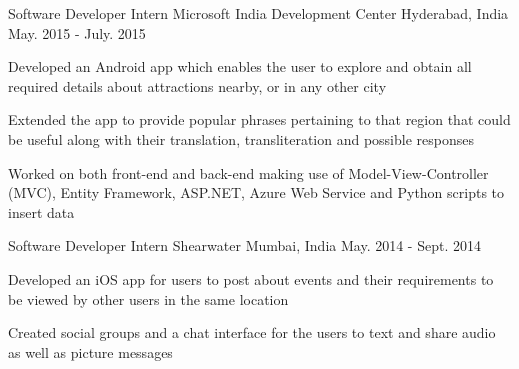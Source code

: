\begin{cventries}
  \cventry
    {Software Developer Intern} %
    {Microsoft India Development Center} %
    {Hyderabad, India} %
    {May. 2015 - July. 2015} %
    {
      \begin{cvitems} %
        \item {Developed an Android app which enables the user to explore and obtain all required details about attractions nearby, or in any other city  }
		\item {Extended the app to provide popular phrases pertaining to that region that could be useful along with their translation, transliteration and possible responses}
		\item {Worked on both front-end and back-end making use of Model-View-Controller (MVC), Entity Framework, ASP.NET, Azure Web Service and Python scripts to insert data}
      \end{cvitems}
    }
	\cventry
	{Software Developer Intern} %
	{Shearwater} %
	{Mumbai, India} %
	{May. 2014 - Sept. 2014} %
	{
		\begin{cvitems} %
			\item {Developed an iOS app for users to post about events and their requirements to be viewed by other users in the same location}
			\item {Created social groups and a chat interface for the users to text and share audio as well as picture messages}
		\end{cvitems}
	}
  
\end{cventries}
